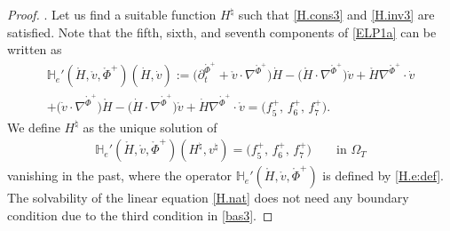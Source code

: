 \documentclass[twoside,11pt]{article}
\numberwithin{equation}{section}
\def\p{\partial}
\begin{document}
\begin{proof}
		\vspace*{2mm}
.\quad
Let us find a suitable function $H^{\natural}$ such that \eqref{H.cons3} and \eqref{H.inv3} are satisfied.
Note that the fifth, sixth, and seventh components of \eqref{ELP1a} can be written as
\begin{multline}
  \mathbb{H}_e'(\mathring{H},\mathring{v},\mathring{\Phi}^+)(\dot{H},\dot{v})
 	:=\big(\p_t^{\mathring{\Phi}^+}+\mathring{v}\cdot \nabla^{\mathring{\Phi}^+}\big)\dot{H}-\big(\mathring{H}\cdot\nabla^{\mathring{\Phi}^+}\big)\dot{v}+\mathring{H}\nabla^{\mathring{\Phi}^+}\cdot\dot{v}	 \\
	+\big(\dot{v}\cdot\nabla^{\mathring{\Phi}^+}\big)\mathring{H}-\big(\dot{H}\cdot\nabla^{\mathring{\Phi}^+}\big)\mathring{v}+\dot{H}\nabla^{\mathring{\Phi}^+}\cdot\mathring{v}
	=\big(f_5^+,\, f_6^+,\, f_7^+\big).
	\label{H.e:def}
\end{multline}
We define $H^{\natural}$ as the unique solution of
\begin{align}
	\mathbb{H}_e'(\mathring{H},\mathring{v},\mathring{\Phi}^+)(H^{\natural},v^{\natural})=
	\big(f_5^+,\, f_6^+,\, f_7^+\big)\qquad \textrm{in }\Omega_{T}
	\label{H.nat}
\end{align}
vanishing in the past,
where the operator $\mathbb{H}_e'(\mathring{H},\mathring{v},\mathring{\Phi}^+)$ is defined by \eqref{H.e:def}.
The solvability of the linear equation \eqref{H.nat} does not need any boundary condition due to the third condition in \eqref{bas3}.



\end{proof}
\end{document}
